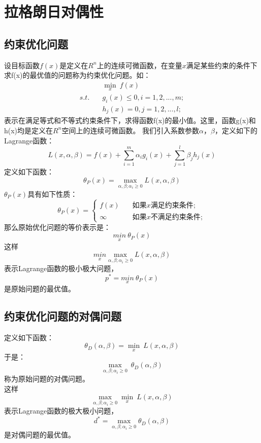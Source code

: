 \chapter{拉格朗日对偶性}
\section{约束优化问题}
设目标函数$f(x)$是定义在$R^n$上的连续可微函数，在变量$x$满足某些约束的条件下求f(x)的最优值的问题称为约束优化问题。如：
\begin{align*}
    & \underset{x}{\min}\ f(x) \\
    s.t.\quad & g_i(x) \le 0, i=1, 2, ..., m; \\
         & h_j(x) = 0, j=1, 2, ..., l;
\end{align*}
表示在满足等式和不等式约束条件下，求得函数f(x)的最小值。这里，函数g(x)和h(x)均是定义在$R^n$空间上的连续可微函数。
我们引入系数参数$\alpha$，$\beta$，定义如下的Lagrange函数：
$$
L(x,\alpha,\beta) = f(x) + \sum_{i=1}^m \alpha_i g_i(x) + \sum_{j=1}^l \beta_j h_j(x)
$$
定义如下函数：
$$
    \theta_P(x) = \underset{\alpha,\beta;\alpha_i \ge 0}{\max} L(x,\alpha,\beta)
$$
$\theta_P(x)$具有如下性质：
$$\theta_P(x)=
\begin{cases}
    f(x)\quad &\mbox{如果$x$满足约束条件};\\
    \infty &\mbox{如果$x$不满足约束条件};
\end{cases}
$$
那么原始优化问题的等价表示是：
$$ \underset{x}{min}\ \theta_P(x) $$
这样
$$\underset{x}{min} \underset{\alpha,\beta;\alpha_i \ge 0}{\max} L(x,\alpha,\beta)$$表示Lagrange函数的极小极大问题，
$$ p^*=\underset{x}{min}\ \theta_P(x) $$
是原始问题的最优值。

\section{约束优化问题的对偶问题}
定义如下函数：
$$
    \theta_D(\alpha,\beta) = \underset{x}{\min}\ L(x,\alpha,\beta)
$$
于是：
$$ \underset{\alpha,\beta;\alpha_i \ge 0}{\max}\ \theta_D(\alpha,\beta) $$
称为原始问题的对偶问题。\\
这样
$$\underset{\alpha,\beta;\alpha_i \ge 0}{\max} \underset{x}{\min}\ L(x,\alpha,\beta)$$
表示Lagrange函数的极大极小问题，
$$ d^*=\underset{\alpha,\beta;\alpha_i \ge 0}{\max} \theta_D(\alpha,\beta) $$
是对偶问题的最优值。

